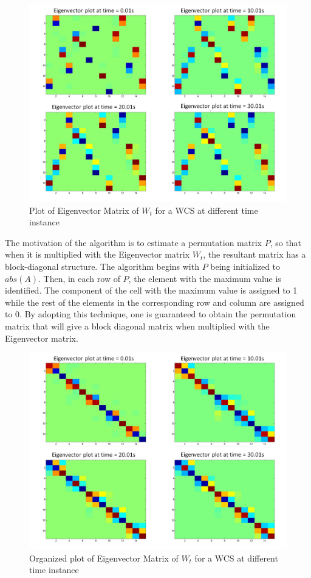 \begin{figure}[H]
\centering
\includegraphics{figures/FIG_4}
\caption{Plot of Eigenvector Matrix of $W_t$ for a WCS at different time instance}
\label{Eigenvect}
\end{figure}

The motivation of the algorithm is to estimate a permutation matrix $P$, so that when it is multiplied with the Eigenvector matrix $W_t$, the resultant matrix has a block-diagonal structure. The algorithm begins with $P$ being initialized to $abs(A)$. Then, in each row of $P$, the element with the maximum value is identified. The component of the cell with the maximum value is assigned to 1 while the rest of the elements in the corresponding row and column are assigned to 0. By adopting this technique, one is guaranteed to obtain the permutation matrix that will give a block diagonal matrix when multiplied with the Eigenvector matrix. 

\begin{figure}[H]
\centering
\includegraphics{figures/FIG_5}
\caption{Organized plot of Eigenvector Matrix of $W_t$ for a WCS at different time instance}
\label{Eigenvect2}
\end{figure}


